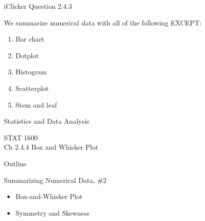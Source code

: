 \documentclass[14pt]{beamer}\usepackage[]{graphicx}\usepackage[]{color}
\begin{document}
\begin{frame}[fragile]{iClicker Question 2.4.3}

We summarize numerical data with all of the following EXCEPT:

\begin{enumerate}
\item Bar chart
\item Dotplot
\item Histogram
\item Scatterplot
\item Stem and leaf
\end{enumerate}
\end{frame}




\begin{frame}[fragile]{Statistics and Data Analysis}

STAT 1600 \\
Ch 2.4.4 Box and Whisker Plot

\end{frame}

\begin{frame}[fragile]{Outline}

Summarizing Numerical Data, \#2  

\begin{itemize}
\item Box-and-Whisker Plot  
\item Symmetry and Skewness
\end{itemize}
\end{frame}
\end{document}
